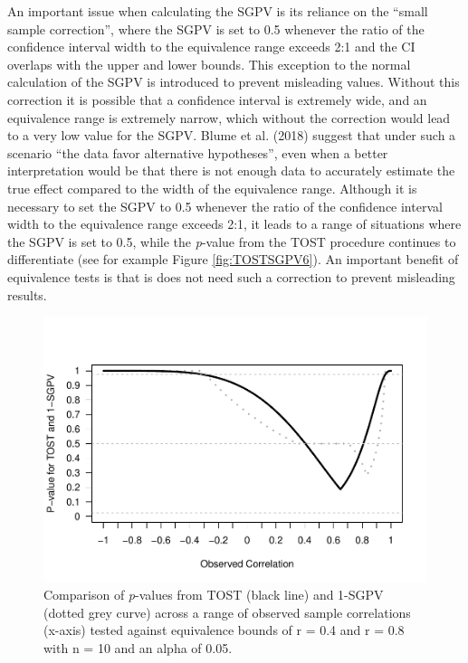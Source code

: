 \documentclass[floatsintext,man]{apa6}
\theoremstyle{definition}
\theoremstyle{definition}
\theoremstyle{definition}
\theoremstyle{remark}
\begin{document}
An important issue when calculating the SGPV is its reliance on the
\enquote{small sample correction}, where the SGPV is set to 0.5 whenever
the ratio of the confidence interval width to the equivalence range
exceeds 2:1 and the CI overlaps with the upper and lower bounds. This
exception to the normal calculation of the SGPV is introduced to prevent
misleading values. Without this correction it is possible that a
confidence interval is extremely wide, and an equivalence range is
extremely narrow, which without the correction would lead to a very low
value for the SGPV. Blume et al. (2018) suggest that under such a
scenario \enquote{the data favor alternative hypotheses}, even when a
better interpretation would be that there is not enough data to
accurately estimate the true effect compared to the width of the
equivalence range. Although it is necessary to set the SGPV to 0.5
whenever the ratio of the confidence interval width to the equivalence
range exceeds 2:1, it leads to a range of situations where the SGPV is
set to 0.5, while the \emph{p}-value from the TOST procedure continues
to differentiate (see for example Figure \ref{fig:TOSTSGPV6}). An
important benefit of equivalence tests is that is does not need such a
correction to prevent misleading results.

\begin{figure}
\centering
\includegraphics{manuscript_files/figure-latex/TOSTSGPV13-1.pdf}
\caption{\label{fig:TOSTSGPV13}Comparison of \emph{p}-values from TOST
(black line) and 1-SGPV (dotted grey curve) across a range of observed
sample correlations (x-axis) tested against equivalence bounds of r =
0.4 and r = 0.8 with n = 10 and an alpha of 0.05.}
\end{figure}
\end{document}
